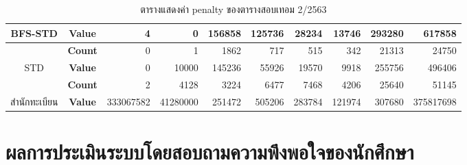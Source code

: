 \begin{table}[]
{\begin{tabular}{@{}ccrrrrrrrr@{}}
    \multirow{-2}{*}{BFS-STD}                    & \textbf{Value}                        & 4                        & 0                        & 156858                        & 125736                       & 28234                        & 13746                        & 293280                        & 617858                        \\ \midrule
                                                 & \textbf{Count}                        & 0                        & 1                        & 1862                          & 717                          & 515                          & 342                          & 21313                         & 24750                         \\ \cmidrule(l){2-10} 
    \multirow{-2}{*}{STD}                        & \textbf{Value}                        & 0                        & 10000                    & 145236                        & 55926                        & 19570                        & 9918                         & 255756                        & 496406                        \\ \midrule
                                                 & \textbf{Count}                        & 2                        & 4128                     & 3224                          & 6477                         & 7468                         & 4206                         & 25640                         & 51145                         \\ \cmidrule(l){2-10} 
    \multirow{-2}{*}{สำนักทะเบียน}               & \textbf{Value}                          & 333067582                 & 41280000                 & 251472                        & 505206                       & 283784                       & 121974                       & 307680                        & 375817698                     \\ \bottomrule
    \end{tabular}%
    }
    \caption{ตารางแสดงค่า penalty ของตารางสอบเทอม 2/2563}
    \label{tab:result_table_263}
\end{table}
\newpage
\section{ผลการประเมินระบบโดยสอบถามความพึงพอใจของนักศึกษา}
